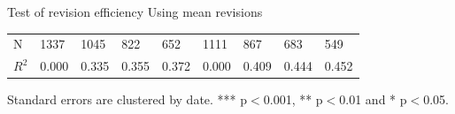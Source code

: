 \documentclass{beamer}
\begin{document}
\begin{frame}{Test of revision efficiency Using mean revisions}
\begin{adjustbox}{width=0.9\textwidth}
\begin{threeparttable}
\begin{tabular}{lllllllll}
			\hline 
			N                   & 1337          & 1045      & 822      & 652      & 1111          & 867       & 683       & 549       \\
			$R^2$                  & 0.000         & 0.335     & 0.355    & 0.372    & 0.000         & 0.409     & 0.444     & 0.452     \\
			\hline 
		\end{tabular} 
		\begin{tablenotes}
			\item Standard errors are clustered by date. *** p$<$0.001, ** p$<$0.01 and * p$<$0.05.
		\end{tablenotes}
	\end{threeparttable}
\end{adjustbox}

\end{frame}
\end{document}
